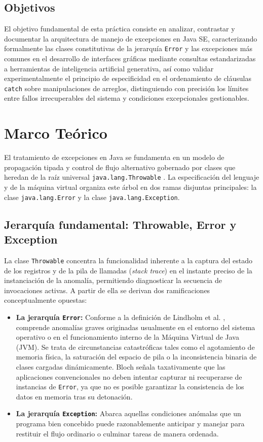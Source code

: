 \documentclass[letterpaper,12pt,oneside]{article}
\numberwithin{figure}{section}
\begin{document}
\subsection{Objetivos}
El objetivo fundamental de esta práctica consiste en analizar, contrastar y documentar la arquitectura de manejo de excepciones en Java SE, caracterizando formalmente las clases constitutivas de la jerarquía \texttt{Error} y las excepciones más comunes en el desarrollo de interfaces gráficas mediante consultas estandarizadas a herramientas de inteligencia artificial generativa, así como validar experimentalmente el principio de especificidad en el ordenamiento de cláusulas \texttt{catch} sobre manipulaciones de arreglos, distinguiendo con precisión los límites entre fallos irrecuperables del sistema y condiciones excepcionales gestionables.

\section{Marco Teórico}

El tratamiento de excepciones en Java se fundamenta en un modelo de propagación tipada y control de flujo alternativo gobernado por clases que heredan de la raíz universal \texttt{java.lang.Throwable} \cite{gosling2023}. La especificación del lenguaje y de la máquina virtual organiza este árbol en dos ramas disjuntas principales: la clase \texttt{java.lang.Error} y la clase \texttt{java.lang.Exception}.

\subsection{Jerarquía fundamental: Throwable, Error y Exception}
La clase \texttt{Throwable} concentra la funcionalidad inherente a la captura del estado de los registros y de la pila de llamadas (\textit{stack trace}) en el instante preciso de la instanciación de la anomalía, permitiendo diagnosticar la secuencia de invocaciones activas. A partir de ella se derivan dos ramificaciones conceptualmente opuestas:
\begin{itemize}
  \item \textbf{La jerarquía \texttt{Error}:} Conforme a la definición de Lindholm et al. \cite{lindholm2023}, comprende anomalías graves originadas usualmente en el entorno del sistema operativo o en el funcionamiento interno de la Máquina Virtual de Java (JVM). Se trata de circunstancias catastróficas tales como el agotamiento de memoria física, la saturación del espacio de pila o la inconsistencia binaria de clases cargadas dinámicamente. Bloch \cite{bloch2018} señala taxativamente que las aplicaciones convencionales no deben intentar capturar ni recuperarse de instancias de \texttt{Error}, ya que no es posible garantizar la consistencia de los datos en memoria tras su detonación.
  \item \textbf{La jerarquía \texttt{Exception}:} Abarca aquellas condiciones anómalas que un programa bien concebido puede razonablemente anticipar y manejar para restituir el flujo ordinario o culminar tareas de manera ordenada.
\end{itemize}
\end{document}
